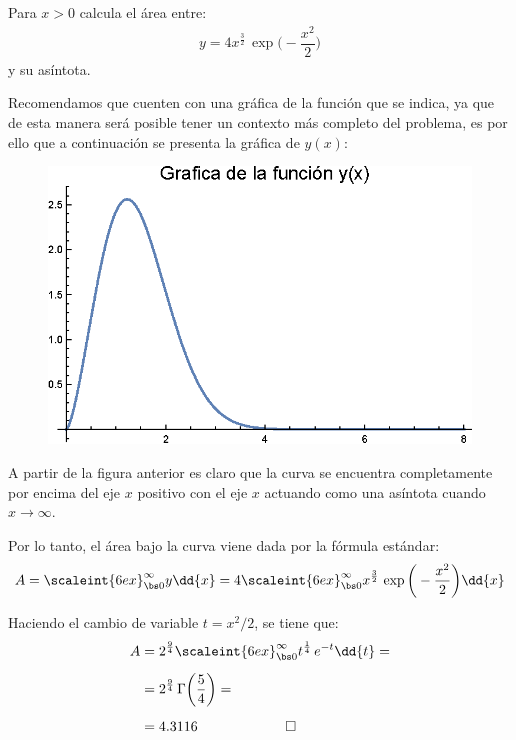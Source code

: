 \begin{ejemplo}
Para $x > 0$ calcula el área entre:
\begin{align*}
y = 4 x^{\frac{3}{2}} \, \exp \bigg( - \dfrac{x^{2}}{2} \bigg)
\end{align*}
y su asíntota.
\par
Recomendamos que cuenten con una gráfica de la función que se indica, ya que de esta manera será posible tener un contexto más completo del problema, es por ello que a continuación se presenta la gráfica de $y(x)$:
\begin{figure}[H]
    \centering
    \includegraphics[scale=1]{Imagenes/Plot_Gamma_02_Ejercicio.eps}
\end{figure}

A partir de la figura anterior es claro que la curva se encuentra completamente por encima del eje $x$ positivo con el eje $x$ actuando como una asíntota cuando $x \to \infty$.
\par
Por lo tanto, el área bajo la curva viene dada por la fórmula estándar:
\begin{align*}
A = \scaleint{6ex}_{\bs 0}^{\infty} y \dd{x} = 4 \scaleint{6ex}_{\bs 0}^{\infty} x^{\frac{3}{2}} \, \exp\bigg( -\dfrac{x^{2}}{2} \bigg) \dd{x}
\end{align*}

Haciendo el cambio de variable $t = x^{2} / 2$, se tiene que:
\begin{align*}
A &= 2^{\frac{9}{4}} \scaleint{6ex}_{\bs 0}^{\infty} t^{\frac{1}{4}} \, e^{-t} \dd{t} = \\[0.5em]
&= 2^{\frac{9}{4}} \, \Gamma \bigg( \dfrac{5}{4} \bigg) = \\[0.5em]
&= 4.3116 \hspace{1.5cm} \qed
\end{align*}
\end{ejemplo}


